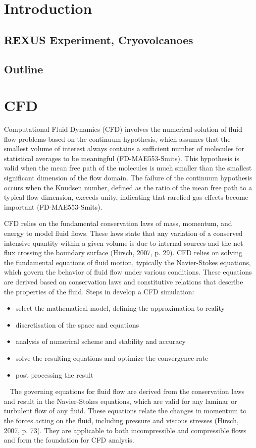\section{Introduction}
\subsection{REXUS Experiment, Cryovolcanoes}
\subsection{Outline}

\section{CFD}
Computational Fluid Dynamics (CFD) involves the numerical solution of fluid flow problems based on the continuum hypothesis, 
which assumes that the smallest volume of interest always contains a sufficient number of molecules for statistical averages 
to be meaningful (FD-MAE553-Smits). This hypothesis is valid when the mean free path of the molecules is much smaller than the 
smallest significant dimension of the flow domain. The failure of the continuum hypothesis occurs when the Knudsen number, 
defined as the ratio of the mean free path to a typical flow dimension, exceeds unity, indicating that rarefied gas effects 
become important (FD-MAE553-Smits).

CFD relies on the fundamental conservation laws of mass, momentum, and energy to model fluid flows. These laws state that 
any variation of a conserved intensive quantity within a given volume is due to internal sources and the net flux crossing
 the boundary surface (Hirsch, 2007, p. 29). CFD relies on solving the fundamental equations of fluid motion, typically the Navier-Stokes equations, which govern
 the behavior of fluid flow under various conditions. These equations are derived based on conservation laws and constitutive 
 relations that describe the properties of the fluid.
Steps in develop a CFD simulation:
\begin{itemize}
    \item select the mathematical model, defining the approximation to reality
    \item discretisation of the space and equations
    \item analysis of numerical scheme and stability and accuracy
    \item solve the resulting equations and optimize the convergence rate
    \item post processing the result
\end{itemize}~\cite{wilcoxTurbulenceModelingCFD2006}
The governing equations for fluid flow are derived from the conservation laws and result in the Navier-Stokes equations, which are valid for any laminar or turbulent flow of 
any fluid. These equations relate the changes in momentum to the forces acting on the fluid, including pressure and 
viscous stresses (Hirsch, 2007, p. 73). They are applicable to both incompressible and compressible flows and form the 
foundation for CFD analysis.

